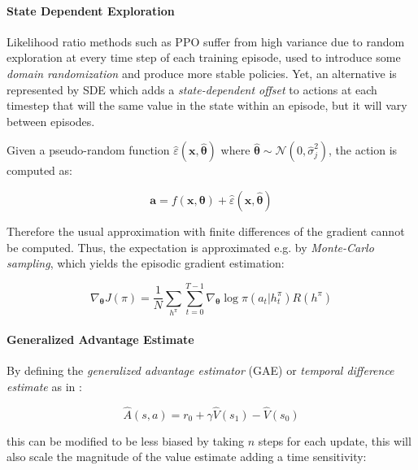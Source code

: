 \paragraph{State Dependent Exploration} Likelihood ratio methods such as \ac{PPO} suffer from high variance due to random exploration at every time step of each training episode, used to introduce some \textit{domain randomization} and produce more stable policies. Yet, an alternative is represented by \ac{SDE} \citep{daelemans_state-dependent_2008, raffin_smooth_2021} which adds a \textit{state-dependent offset} to actions at each timestep that will the same value in the state within an episode, but it will vary between episodes.

Given a pseudo-random function $\hat{\varepsilon}(\mathbf{x}, \hat{\boldsymbol{\theta}})$ where $\hat{\boldsymbol{\theta}} \sim \mathcal{N}(0, \hat{\sigma} _j ^2)$, the action is computed as:

\begin{equation}
    \mathbf{a} = f(\mathbf{x}, \boldsymbol{\theta}) + \hat{\varepsilon}(\mathbf{x}, \hat{\boldsymbol{\theta}})
\end{equation}

Therefore the usual approximation with finite differences of the gradient cannot be computed. Thus, the expectation is approximated e.g. by \textit{Monte-Carlo sampling}, which yields \citep{williams_simple_1992} the episodic gradient estimation:

\begin{equation}
    \nabla _{\boldsymbol{\theta}} J(\pi) = \frac{1}{N} \sum _{h^{\pi}} \sum ^{T-1} _{t = 0} \nabla _{\boldsymbol{\theta}} \log \pi(a _t | h _t ^{\pi}) R(h ^{\pi})
\end{equation}

\paragraph{Generalized Advantage Estimate}
By defining the \textit{generalized advantage estimator} (\ac{GAE}) or \textit{temporal difference estimate} as in \cite{schulman_high-dimensional_2018}:

\begin{equation}
    \hat{A}(s,a) = r _0 + \gamma \hat{V}(s _1) - \hat{V}(s _0)
\end{equation}

this can be modified to be less biased by taking $n$ steps for each update, this will also scale the magnitude of the value estimate adding a time sensitivity:

